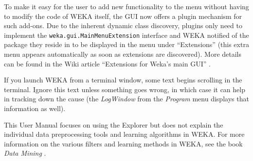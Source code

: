 To make it easy for the user to add new functionality to the menu without having to modify 
the code of WEKA itself, the GUI now offers a plugin mechanism for such add-ons. 
Due to the inherent dynamic
class discovery, plugins only need to implement the \texttt{weka.gui.MainMenuExtension}
interface and WEKA notified of the package they reside in to be displayed in the menu under 
``Extensions'' (this extra menu appears automatically as soon as extensions are discovered). 
More details can be found in the Wiki article ``Extensions for Weka's main GUI'' 
\cite{mainextensions}.

If you launch WEKA from a terminal window, some text begins scrolling in the
terminal. Ignore this text unless something goes wrong, in which case it can
help in tracking down the cause (the \textit{LogWindow} from the \textit{Program} menu 
displays that information as well).

This User Manual focuses on using the Explorer but does not explain
the individual data preprocessing tools and learning algorithms in
WEKA. For more information on the various filters and learning methods
in WEKA, see the book {\em Data Mining} \cite{witten}.
